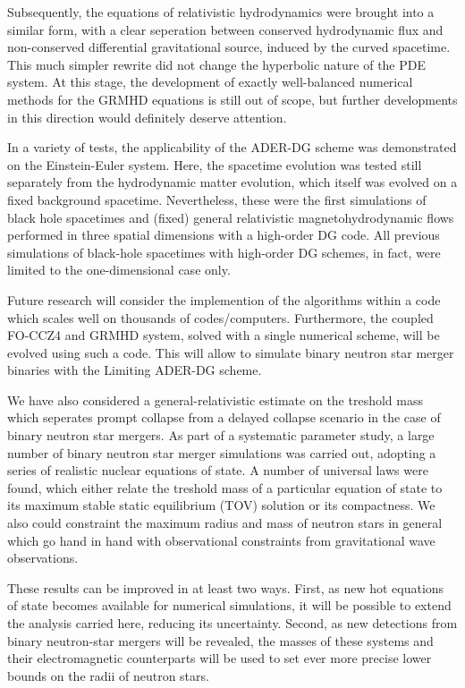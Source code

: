 \begin{fullwidth}
Subsequently, the equations of relativistic hydrodynamics were brought into a
similar form, with a clear seperation between conserved hydrodynamic flux and
non-conserved differential gravitational source, induced by the curved 
spacetime. This much simpler rewrite did not change the hyperbolic nature of
the PDE system. At this  stage, the development of exactly well-balanced
numerical methods for the GRMHD equations is still out of scope, but further
developments in this direction would definitely deserve attention.

In a variety of tests, the applicability of the ADER-DG scheme was demonstrated
on the Einstein-Euler system. Here, the spacetime evolution was tested still
separately from the hydrodynamic matter evolution, which itself was evolved
on a fixed background spacetime. Nevertheless, these were the first simulations
of black hole spacetimes and (fixed) general relativistic
magnetohydrodynamic flows performed in three spatial dimensions with a
high-order DG code.
All previous simulations of black-hole spacetimes with high-order DG
schemes, in fact, were limited to the one-dimensional case only.

Future research will consider the implemention of the algorithms within
a code which scales well on thousands of codes/computers. Furthermore,
the coupled FO-CCZ4 and GRMHD system, solved with a single numerical scheme,
will be evolved using such a code. This will allow to simulate binary neutron
star merger binaries with the Limiting ADER-DG scheme.

We have also considered a general-relativistic estimate on the treshold mass
which seperates prompt collapse from a delayed collapse scenario in the case of
binary neutron star mergers. As part of a systematic parameter study,
a large number of binary neutron star merger simulations was carried out,
adopting a series of realistic nuclear equations of state. A number of
universal laws were found, which either relate the treshold mass of a
particular equation of state to its maximum stable static equilibrium (TOV)
solution or its compactness. We also could constraint the maximum radius and 
mass of neutron stars in general which go hand in hand with observational 
constraints from gravitational wave observations.

These results can be improved in at least two ways.  First, as new hot
equations of state becomes available for numerical simulations, it will be
possible to extend the analysis carried here, reducing  its uncertainty.
Second, as new detections from binary neutron-star mergers will be revealed,
the masses of these systems and their electromagnetic counterparts will be
used to set ever more precise lower bounds on the radii of neutron stars.


\end{fullwidth}
